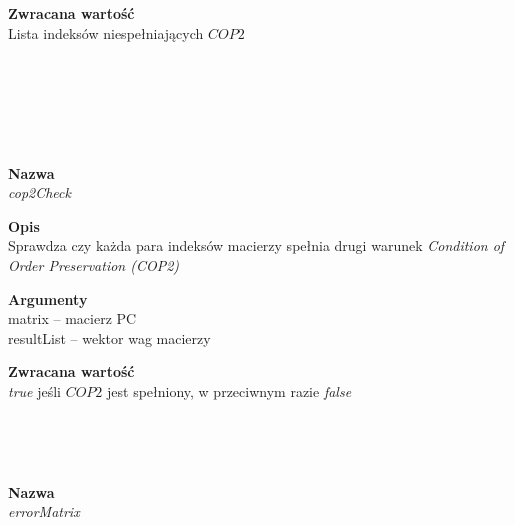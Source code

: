 \begin{spacing}{1.1}
\begin{spacing}{1.1}
\begin{spacing}{1.1}
\begin{spacing}{1.2}
\begin{spacing}{1.1}
\textbf{Zwracana wartość}\\ Lista indeksów niespełniających $COP2$ \\ \begin{spacing}{0.3}  \end{spacing}\\



\\~\\ 
\begin{spacing}{1.2}
 \\ \begin{spacing}{0.5}  \end{spacing}

\textbf{Nazwa}\\  \emph{cop2Check} \\ \begin{spacing}{0.3}  \end{spacing}
 
\textbf{Opis}\\ Sprawdza czy każda para indeksów macierzy spełnia drugi warunek \textit{Condition of Order Preservation (COP2)} \\  \begin{spacing}{0.3}  \end{spacing}
 
\textbf{Argumenty} \\
matrix -- macierz PC \\  
resultList -- wektor wag macierzy \\  \begin{spacing}{0.3}  \end{spacing}

\textbf{Zwracana wartość}\\ \textit{true} jeśli $COP2$ jest spełniony, w przeciwnym razie \textit{false}\\ \begin{spacing}{0.3}  \end{spacing}\\



\newpage
\begin{spacing}{1.2}
 \\ \begin{spacing}{0.5}  \end{spacing}

\textbf{Nazwa}\\  \emph{errorMatrix} \\ \begin{spacing}{0.3}  \end{spacing}
 

\end{spacing}
\end{spacing}
\end{spacing}
\end{spacing}
\end{spacing}
\end{spacing}
\end{spacing}
